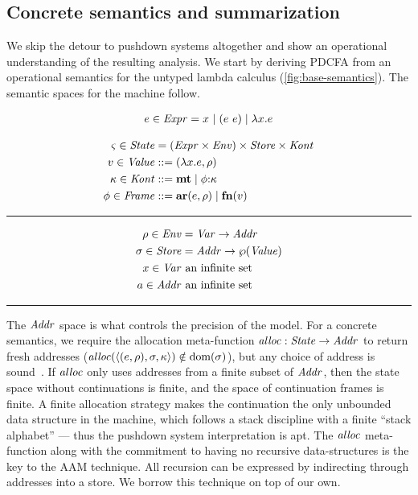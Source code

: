 \subsection{Concrete semantics and summarization}
We skip the detour to pushdown systems altogether and show an operational understanding of the resulting analysis.
%
We start by deriving PDCFA from an operational semantics for the untyped lambda calculus (\autoref{fig:base-semantics}).
%
The semantic spaces for the machine follow.

{
\setlength{\abovedisplayskip}{0pt}
\setlength{\belowdisplayskip}{4pt}
\setlength{\abovedisplayshortskip}{0pt}
\setlength{\belowdisplayshortskip}{8pt}
\begin{align*}
  e \in \mathit{Expr} = x^{{}} \mathrel{\mid} (e\ e){} \mathrel{\mid} \lambda{} x. e
\end{align*}
\begin{minipage}[b]{.55\linewidth}
  \begin{align*}
  \varsigma \in \mathit{State} &= (\mathit{Expr} \times \mathit{Env}) \times \mathit{Store} \times \mathit{Kont} \\
  v \in \mathit{Value} &::= (\lambda{} x. e, \rho) \\
  \kappa \in \mathit{Kont} &::= \mathbf{mt} \mathrel{\mid} \phi{\tt :} \kappa \\
  \phi \in \mathit{Frame} &::= \mathbf{ar}{}(e,\rho) \mathrel{\mid} \mathbf{fn}{}(v)
  \end{align*}\hrule height 0pt\end{minipage}
\begin{minipage}[b]{.40\linewidth}
  \begin{align*}
  \rho \in \mathit{Env} &= \mathit{Var} \to \mathit{Addr} \\
  \sigma \in \mathit{Store} &= \mathit{Addr} \to \wp(\mathit{Value}) \\
  x \in \mathit{Var} &\text{ an infinite set} \\
  a \in \mathit{Addr} &\text{ an infinite set}
  \end{align*}\hrule height 0pt\end{minipage}
}

The $\mathit{Addr}$ space is what controls the precision of the model.
%
For a concrete semantics, we require the allocation meta-function $\mathit{alloc} :
\mathit{State} \to \mathit{Addr}$ to return fresh addresses ($\mathit{alloc}(\langle (e, \rho), \sigma, \kappa \rangle) \notin \text{dom}(\sigma)$), but any choice of address is sound~\citep{dvanhorn:Might2009Posteriori}.
%
If $\mathit{alloc}$ only uses addresses from a finite subset of $\mathit{Addr}$, then the state space without continuations is finite, and the space of continuation frames is finite.
%
A finite allocation strategy makes the continuation the only unbounded data structure in the machine, which follows a stack discipline with a finite ``stack alphabet'' --- thus the pushdown system interpretation is apt.
%
The $\mathit{alloc}$ meta-function along with the commitment to having no recursive data-structures is the key to the AAM technique.
%
All recursion can be expressed by indirecting through addresses into a store.
%
We borrow this technique on top of our own.

